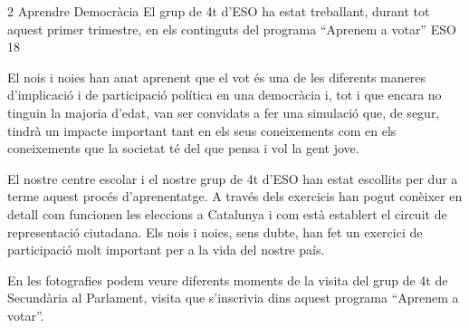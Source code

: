 \begin{news}
{2} %
{Aprendre Democràcia}
{El grup de 4t d’ESO ha estat treballant, durant tot aquest primer trimestre, en els continguts del programa “Aprenem a votar”}
{ESO}
{18} %


El nois i noies han anat aprenent que el vot  és una de les diferents maneres d’implicació i de participació política en una democràcia i, tot i que encara no tinguin la majoria d’edat,  van ser convidats a fer una simulació que, de segur, tindrà un impacte important tant en els seus coneixements com en els coneixements que la societat té del que pensa i vol la gent jove.

El nostre centre escolar i el nostre grup de 4t d’ESO han estat escollits per dur a terme aquest procés d’aprenentatge. A través dels exercicis han pogut  conèixer en detall com funcionen les eleccions a Catalunya i com està establert el circuit de representació ciutadana. Els nois i noies, sens dubte,  han fet un exercici de participació molt important per a la vida del nostre país. 

En les fotografies podem veure diferents moments de la visita del grup de 4t de Secundària al Parlament, visita que s’inscrivia dins aquest programa “Aprenem a votar”.

\end{news}


